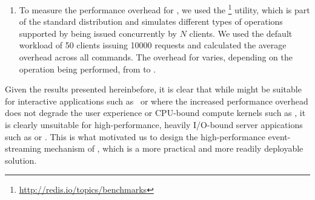 \begin{enumerate}
\item[\redis] To measure the performance overhead for \redis, we used the
  \redisbenchmark\footnote{\url{http://redis.io/topics/benchmarks}} utility,
  which is part of the standard \redis distribution and simulates different
  types of operations supported by \redis being issued concurrently by $N$
  clients. We used the default workload of \num{50} clients issuing \num{10000}
  requests and calculated the average overhead across all commands. The
  overhead for \redis varies, depending on the operation being performed, from
  \minRedisOver to \maxRedisOver.
\end{enumerate}

Given the results presented hereinbefore, it is clear that while \mx might be
suitable for interactive applications such as \gnu~\coreutils or \vim where the
increased performance overhead does not degrade the user experience or
CPU-bound compute kernels such as \speczerosix, it is clearly unsuitable for
high-performance, heavily I/O-bound server appications such as \lighttpd or
\redis. This is what motivated us to design the high-performance
event-streaming mechanism of \varan, which is a more practical and more readily
deployable solution.
